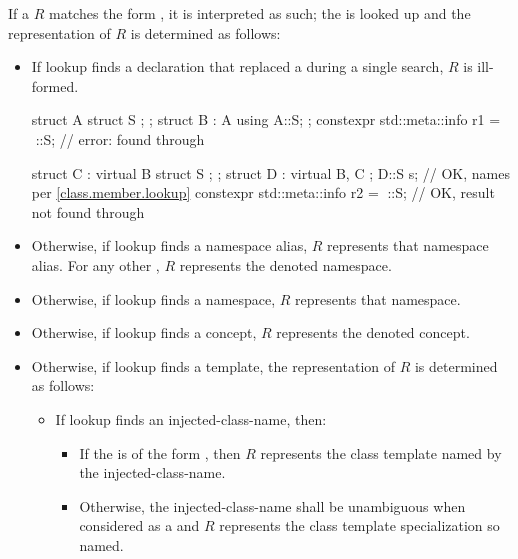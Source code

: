 \pnum
If a  $R$ matches
the form ,
it is interpreted as such;
the  is looked up and
the representation of $R$ is determined as follows:
\begin{itemize}
\item
If lookup finds a declaration
that replaced a 
during a single search,
$R$ is ill-formed.
\begin{example}
\begin{codeblock}
struct A { struct S {}; };
struct B : A { using A::S; };
constexpr std::meta::info r1 = ^^B::S;  // error:  found through 

struct C : virtual B { struct S {}; };
struct D : virtual B, C {};
D::S s;                                 // OK, names  per \ref{class.member.lookup}
constexpr std::meta::info r2 = ^^D::S;  // OK, result  not found through 
\end{codeblock}
\end{example}
\item
Otherwise, if lookup finds a namespace alias,
$R$ represents that namespace alias.
For any other ,
$R$ represents the denoted namespace.
\item
Otherwise, if lookup finds a namespace,
$R$ represents that namespace.
\item
Otherwise, if lookup finds a concept,
$R$ represents the denoted concept.
\item
Otherwise, if lookup finds a template,
the representation of $R$ is determined as follows:
\begin{itemize}
\item
If lookup finds an injected-class-name, then:
\begin{itemize}
\item
If the  is of the form
,
then $R$ represents the class template named by the injected-class-name.
\item
Otherwise, the injected-class-name shall be unambiguous
when considered as a  and
$R$ represents the class template specialization so named.
\end{itemize}

\end{itemize}
\end{itemize}
